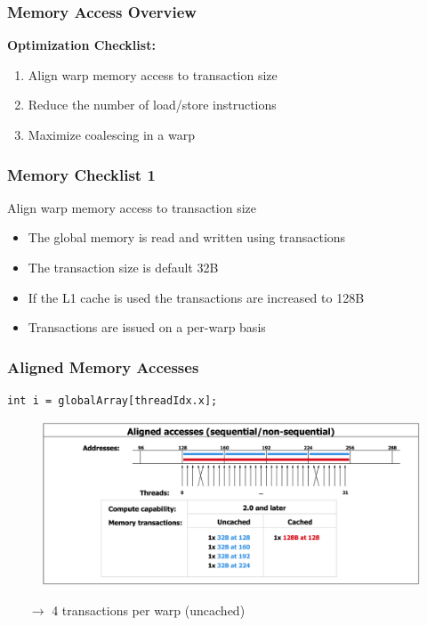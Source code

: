 \documentclass[aspectratio=169,handout]{beamer}
\begin{document}
\begin{frame}[fragile]
\frametitle{Memory Access Overview}
\textbf{Optimization Checklist:}
\begin{enumerate}
	\item Align warp memory access to transaction size
	\item Reduce the number of load/store instructions
	\item Maximize coalescing in a warp
\end{enumerate}
\end{frame}


\begin{frame}[fragile]
\frametitle{Memory Checklist 1}
\begin{mdframed}[]
Align warp memory access to transaction size
\end{mdframed}
\vspace{0.3cm}
\begin{itemize}
\item The global memory is read and written using transactions
\item The transaction size is default 32B 
\item If the L1 cache is used the transactions are increased to 128B
\item Transactions are issued on a per-warp basis
\end{itemize}
\end{frame}

\begin{frame}[fragile]
\frametitle{Aligned Memory Accesses}
\begin{lstlisting}
int i = globalArray[threadIdx.x];
\end{lstlisting}
		\begin{figure}
		\includegraphics[height=0.7\textheight]{coa1}
	\end{figure}
\begin{itemize}
	\item[$\rightarrow$] 4 transactions per warp (uncached)
	\end{itemize}
\end{frame}
\end{document}
